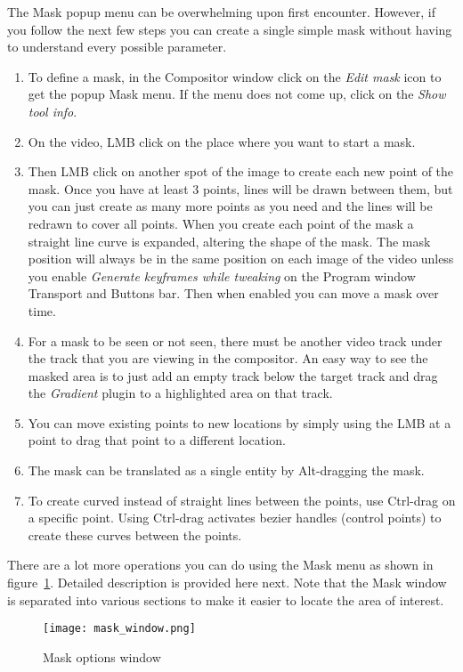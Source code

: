 The Mask popup menu can be overwhelming upon first encounter.  However, if you follow the next
few steps you can create a single simple mask without having to understand every possible parameter.
\begin{enumerate}
    \item To define a mask, in the Compositor window click on the \textit{Edit mask} icon to get the popup Mask menu.  If the menu does not come up, click on the \textit{Show tool info}.
    \item  On the video, LMB click on the place where you want to start a mask.
    \item  Then LMB click on another spot of the image to create each new point of the mask. Once
you have at least 3 points, lines will be drawn between them, but you can just create as many
more points as you need and the lines will be redrawn to cover all points. When you 
create each point of the mask a straight line curve is expanded, altering the shape of the mask.
The mask position will always be in the same position on each image of the video unless you enable 
\textit{Generate keyframes while tweaking} on the Program window Transport and Buttons bar. Then when 
enabled you can move a mask over time.
     \item For a mask to be seen or not seen, there must be another video track under the track
that you are viewing in the compositor.  An easy way to see the masked area is to just add an empty track
below the target track and drag the \textit{Gradient} plugin to a highlighted area on that track.
     \item  You can move existing points to new locations by simply using the LMB at a point to
drag that point to a different location.
    \item  The mask can be translated as a single entity by Alt-dragging the mask.
    \item To create curved instead of straight lines between the points, use  Ctrl-drag on a
specific point. Using Ctrl-drag activates bezier handles (control points) to create these curves
between the points.       
\end{enumerate}

There are a lot more operations you can do using the Mask menu as shown in 
figure~\ref{fig:mask_window}.  Detailed description is provided here next.  Note that the Mask
window is separated into various sections to make it easier to locate the area of interest.

\begin{figure}[htpb]
    \centering
    \texttt{[image: mask\_window.png]}
    \caption{Mask options window}
    \label{fig:mask_window}
\end{figure}

